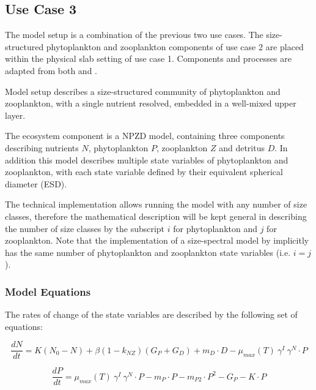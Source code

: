 \documentclass[template.tex]{subfiles}
\begin{document}
\subsection{Use Case 3}
The model setup is a combination of the previous two use cases. The size-structured phytoplankton and zooplankton components of use case 2 are placed within the physical slab setting of use case 1. Components and processes are adapted from both \citet{Banas2011b} and \citet{Anderson2015c}.

Model setup describes a size-structured community of phytoplankton and zooplankton, with a single nutrient resolved, embedded in a well-mixed upper layer.

The ecosystem component is a NPZD model, containing three components describing nutrients $N$, phytoplankton $P$, zooplankton $Z$ and detritus $D$. In addition this model describes multiple state variables of phytoplankton and zooplankton, with each state variable defined by their equivalent spherical diameter (ESD).

The technical implementation allows running the model with any number of size classes, therefore the mathematical description will be kept general in describing the number of size classes by the subscript $i$ for phytoplankton and $j$ for zooplankton. Note that the implementation of a size-spectral model by \citeauthor{Banas2011b} implicitly has the same number of phytoplankton and zooplankton state variables (i.e. $i = j$).



\subsubsection{Model Equations}
The rates of change of the state variables are described by the following set of equations:

\begin{equation}
    \frac{d N}{d t} = 
    K (N_0 - N) %
    + \beta(1 - k_{NZ})(G_P + G_D) %
    + m_D \cdot D %
    - \mu_{max}(T) \  \gamma^{I} \ \gamma^{N} \cdot P %
    
\end{equation}

\begin{equation}
    \frac{d P}{d t} =
    \mu_{max}(T) \  \gamma^{I} \ \gamma^{N} \cdot P  %
    - m_P \cdot P %
    - m_{P2} \cdot P^2 %
    - G_P %
    - K \cdot P %
    
\end{equation}
\end{document}
